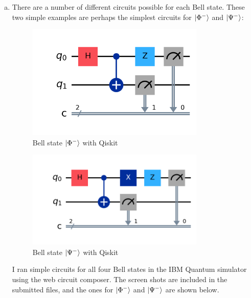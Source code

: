 \documentclass[12pt]{extarticle}
\begin{document}
\begin{enumerate}[(a)]
\item There are a number of different circuits possible for each Bell state.
These two simple examples are perhaps the simplest circuits for $\ket{\Phi^{-}}$ and $\ket{\Psi^{-}}$:

\begin{figure}[H]
\centering
\includegraphics[width=0.80\textwidth]{images/qiskit_phiminus.png}
\caption{Bell state $\ket{\Phi^{-}}$ with Qiskit}
\end{figure}
\begin{figure}[H]
\centering
\includegraphics[width=0.80\textwidth]{images/qiskit_psiminus.png}
\caption{Bell state $\ket{\Psi^{-}}$ with Qiskit}
\end{figure}

I ran simple circuits for all four Bell states in the IBM Quantum simulator using the web circuit composer.
The screen shots are included in the submitted files, and the ones for $\ket{\Phi^{-}}$ and $\ket{\Psi^{-}}$ are shown below.


\end{enumerate}
\end{document}
